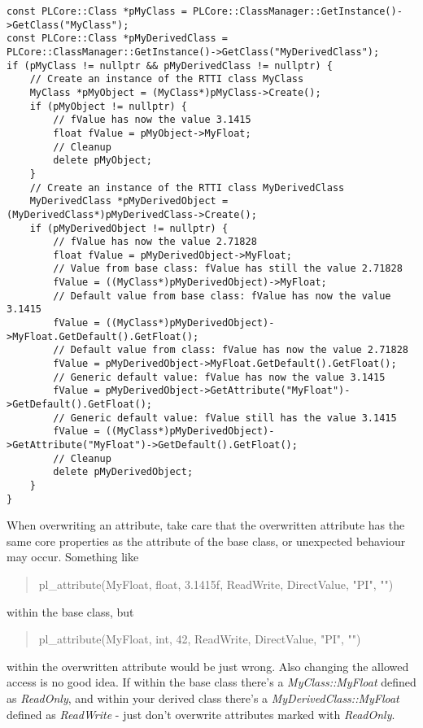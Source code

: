 \begin{lstlisting}[label=Code:RTTIAttributeOverwriteUsage,caption={Using overwritten \ac{RTTI} attributes}]
const PLCore::Class *pMyClass = PLCore::ClassManager::GetInstance()->GetClass("MyClass");
const PLCore::Class *pMyDerivedClass = PLCore::ClassManager::GetInstance()->GetClass("MyDerivedClass");
if (pMyClass != nullptr && pMyDerivedClass != nullptr) {
	// Create an instance of the RTTI class MyClass
	MyClass *pMyObject = (MyClass*)pMyClass->Create();
	if (pMyObject != nullptr) {
		// fValue has now the value 3.1415
		float fValue = pMyObject->MyFloat;
		// Cleanup
		delete pMyObject;
	}
	// Create an instance of the RTTI class MyDerivedClass
	MyDerivedClass *pMyDerivedObject = (MyDerivedClass*)pMyDerivedClass->Create();
	if (pMyDerivedObject != nullptr) {
		// fValue has now the value 2.71828
		float fValue = pMyDerivedObject->MyFloat;
		// Value from base class: fValue has still the value 2.71828
		fValue = ((MyClass*)pMyDerivedObject)->MyFloat;
		// Default value from base class: fValue has now the value 3.1415
		fValue = ((MyClass*)pMyDerivedObject)->MyFloat.GetDefault().GetFloat();
		// Default value from class: fValue has now the value 2.71828
		fValue = pMyDerivedObject->MyFloat.GetDefault().GetFloat();
		// Generic default value: fValue has now the value 3.1415
		fValue = pMyDerivedObject->GetAttribute("MyFloat")->GetDefault().GetFloat();
		// Generic default value: fValue still has the value 3.1415
		fValue = ((MyClass*)pMyDerivedObject)->GetAttribute("MyFloat")->GetDefault().GetFloat();
		// Cleanup
		delete pMyDerivedObject;
	}
}
\end{lstlisting}

When overwriting an attribute, take care that the overwritten attribute has the same core properties as the attribute of the base class, or unexpected behaviour may occur. Something like \begin{quote}pl\_attribute(MyFloat, float, 3.1415f, ReadWrite, DirectValue, "PI", "")\end{quote} within the base class, but \begin{quote}pl\_attribute(MyFloat, int, 42, ReadWrite, DirectValue, "PI", "")\end{quote} within the overwritten attribute would be just wrong. Also changing the allowed access is no good idea. If within the base class there's a \emph{MyClass::MyFloat} defined as \emph{ReadOnly}, and within your derived class there's a \emph{MyDerivedClass::MyFloat} defined as \emph{ReadWrite} - just don't overwrite attributes marked with \emph{ReadOnly}.

